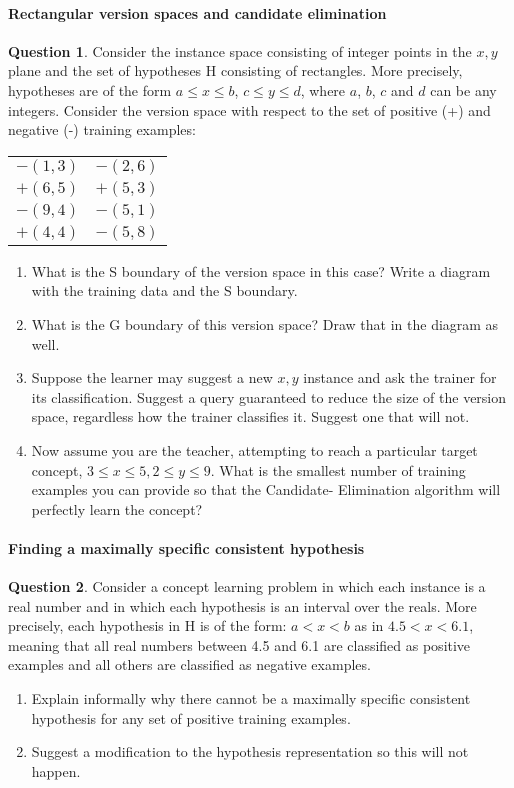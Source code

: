 \documentclass[11pt,a4paper]{article}
\theoremstyle{definition}%
\newtheorem{Q}{Question}[] %
\begin{document}
\paragraph{Rectangular version spaces and candidate elimination}
\begin{Q}
    Consider the instance space consisting of integer points in the $x, y$ plane and the set of
hypotheses H consisting of rectangles. More precisely, hypotheses are of the form $a \leq x \leq b$,
$c \leq y \leq d$, where $a$, $b$, $c$ and $d$ can be any integers. Consider the version space with 
respect to the set of positive (+) and negative (-) training examples:

\begin{tabular}{ll}
$-(1,3)$ & $-(2,6)$ \\
$+(6,5)$ & $+(5,3)$ \\
$-(9,4)$ & $-(5,1)$ \\
$+(4,4)$ & $-(5,8)$
\end{tabular}

\begin{enumerate}
    \item What is the S boundary of the version space in this case? Write a diagram with the
training data and the S boundary.
    \item What is the G boundary of this version space? Draw that in the diagram as well.
    \item Suppose the learner may suggest a new $x, y$ instance and ask the trainer for its 
        classification. Suggest a query guaranteed to reduce the size of the version space, 
        regardless how the trainer classifies it. Suggest one that will not.
    \item Now assume you are the teacher, attempting to reach a particular target concept,
$3 \leq x \leq 5, 2 \leq y \leq 9$. What is the smallest number of training examples you can
provide so that the Candidate- Elimination algorithm will perfectly learn the concept?

\end{enumerate}
\end{Q}

\paragraph{Finding a maximally specific consistent hypothesis}
\begin{Q}
Consider a concept learning problem in which each instance is a real number and in which
each hypothesis is an interval over the reals. More precisely, each hypothesis in H is of the
form: $a < x < b$ as in $4.5 < x < 6.1$, meaning that all real numbers between 4.5 and 6.1 are
classified as positive examples and all others are classified as negative examples.
\begin{enumerate}
    \item Explain informally why there cannot be a maximally specific consistent hypothesis for
any set of positive training examples.
    \item Suggest a modification to the hypothesis representation so this will not happen.
\end{enumerate}
\end{Q}
\end{document}
